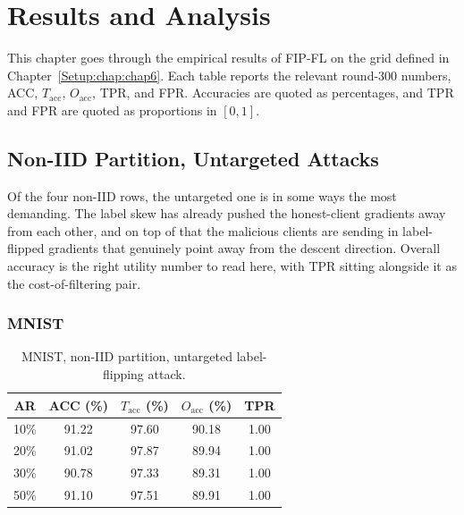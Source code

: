\chapter{Results and Analysis}
\label{Results:chap:chap7}
\graphicspath{{16.Chapter7/Images/}}
\newcommand{\OverallAccHead}{\textbf{ACC (\%)}}
\newcommand{\TargetAccHead}{\textbf{$T_{\text{acc}}$ (\%)}}
\newcommand{\OtherAccHead}{\textbf{$O_{\text{acc}}$ (\%)}}

This chapter goes through the empirical results of FIP-FL on the grid defined in Chapter~\ref{Setup:chap:chap6}. Each table reports the relevant round-300 numbers, ACC, $T_{\text{acc}}$, $O_{\text{acc}}$, TPR, and FPR. Accuracies are quoted as percentages, and TPR and FPR are quoted as proportions in $[0,1]$.

\section{Non-IID Partition, Untargeted Attacks}
\label{sec:res-nonIID-untarg}

Of the four non-IID rows, the untargeted one is in some ways the most demanding. The label skew has already pushed the honest-client gradients away from each other, and on top of that the malicious clients are sending in label-flipped gradients that genuinely point away from the descent direction. Overall accuracy is the right utility number to read here, with TPR sitting alongside it as the cost-of-filtering pair.

\subsection{MNIST}
\label{sec:res-nonIID-untarg-mnist}

\begin{table}[H]
\centering
\caption{MNIST, non-IID partition, untargeted label-flipping attack.}
\label{tab:res-nonIID-untarg-mnist}
\begin{tabular}{@{}ccccc@{}}
\toprule
\textbf{AR} & \OverallAccHead & \TargetAccHead & \OtherAccHead & \textbf{TPR} \\
\midrule
10\% & 91.22 & 97.60 & 90.18 & 1.00 \\
20\% & 91.02 & 97.87 & 89.94 & 1.00 \\
30\% & 90.78 & 97.33 & 89.31 & 1.00 \\
50\% & 91.10 & 97.51 & 89.91 & 1.00 \\
\bottomrule
\end{tabular}
\end{table}

